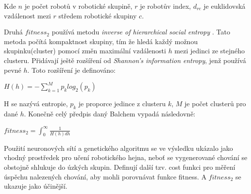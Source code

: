 \par 
Kde $n$ je počet robotů v robotické skupině, $r$ je robotův index, $d_{rc}$ je euklidovská vzdálenost mezi $r$ středem robotické skupiny $c$. 
\par
Druhá $fitness_2$ používá metodu \textit{inverse of hierarchical social entropy} \citep{balch2000hierarchic}. Tato metoda počítá kompaktnost skupiny, tím že hledá každý možnou skupinku(cluster) pomocí změn maximální vzdálenosti $h$ mezi jedinci ze stejného clusteru. Přidávají ještě rozšíření od \textit{Shannon's information entropy}, jenž používá pevné $h$. Toto rozšíření je definováno: 
\par 
\begin{center}
\textbf{$H(h)=-\sum\limits_{k=1}^{M} p_k log_2(p_k)$}
\end{center}
\par 
H se nazývá entropie, $p_k$ je proporce jedince z clusteru $k$, $M$ je počet clusterů pro dané $h$. Konečně celý předpis daný Balchem vypadá následovně: 
\par
\begin{center}
\textbf{$fitness_2 = \int_{0}^{\infty} \frac{1}{H(h)dh}$}
\end{center}
\par 
Použití neuronových sítí a genetického algoritmu se ve výsledku ukázalo jako vhodný prostředek pro učení robotického hejna, neboť se vygenerované chování se obstojně shlukuje do úzkých skupin. Definují další tzv. cost funkci pro měření úspěchu nalezených chování, aby mohli porovnávat funkce fitness. A $fitness_2$ se ukazuje jako účinější. 
